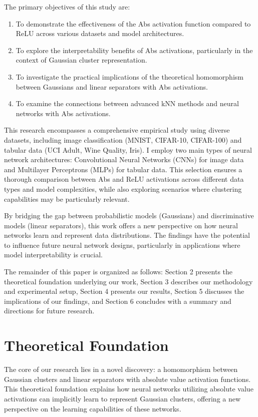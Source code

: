 \documentclass[11pt]{article}
\begin{document}
The primary objectives of this study are:
\begin{enumerate}
\item To demonstrate the effectiveness of the Abs activation function compared to ReLU across 
various datasets and model architectures.
\item To explore the interpretability benefits of Abs activations, particularly in the context of 
Gaussian cluster representation.
\item To investigate the practical implications of the theoretical homomorphism between Gaussians 
and linear separators with Abs activations.
\item To examine the connections between advanced kNN methods and neural networks with Abs activations.
\end{enumerate}

This research encompasses a comprehensive empirical study using diverse datasets, including image 
classification (MNIST, CIFAR-10, CIFAR-100) and tabular data (UCI Adult, Wine Quality, Iris). I 
employ two main types of neural network architectures: Convolutional Neural Networks (CNNs) for 
image data and Multilayer Perceptrons (MLPs) for tabular data. This selection ensures a thorough 
comparison between Abs and ReLU activations across different data types and model complexities, 
while also exploring scenarios where clustering capabilities may be particularly relevant.

By bridging the gap between probabilistic models (Gaussians) and discriminative models (linear 
separators), this work offers a new perspective on how neural networks learn and represent data 
distributions. The findings have the potential to influence future neural network designs, 
particularly in applications where model interpretability is crucial.

The remainder of this paper is organized as follows: Section 2 presents the theoretical foundation 
underlying our work, Section 3 describes our methodology and experimental setup, Section 4 
presents our results, Section 5 discusses the implications of our findings, and Section 6 
concludes with a summary and directions for future research.

\section{Theoretical Foundation}
The core of our research lies in a novel discovery: a homomorphism between Gaussian clusters and 
linear separators with absolute value activation functions. This theoretical foundation explains how neural networks utilizing absolute value activations can implicitly learn to represent Gaussian clusters, offering a new perspective on the learning capabilities of these networks.
\end{document}
